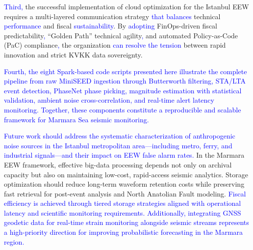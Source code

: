 \documentclass[data,article,submit,pdftex,moreauthors]{Definitions/mdpi}
\begin{document}
\textcolor{blue}{Third,} the successful implementation of cloud optimization for the Istanbul EEW requires a multi-layered communication strategy \textcolor{blue}{that balances} technical \textcolor{blue}{performance} and fiscal \textcolor{blue}{sustainability}. By \textcolor{blue}{adopting} FinOps-driven fiscal predictability\textcolor{blue}{,} ``Golden Path'' technical agility\textcolor{blue}{,} and automated Policy-as-Code (PaC) compliance\textcolor{blue}{,} the organization \textcolor{blue}{can resolve the tension} between rapid innovation and strict KVKK data sovereignty.

\textcolor{blue}{Fourth, the eight Spark-based code scripts presented here illustrate the complete pipeline from raw MiniSEED ingestion through Butterworth filtering, STA/LTA event detection, PhaseNet phase picking, magnitude estimation with statistical validation, ambient noise cross-correlation, and real-time alert latency monitoring. Together, these components constitute a reproducible and scalable framework for Marmara Sea seismic monitoring.}

\textcolor{blue}{Future work should address the systematic characterization of anthropogenic noise sources in the Istanbul metropolitan area—including metro, ferry, and industrial signals—and their impact on EEW false alarm rates.} In the Marmara EEW framework, effective big-data processing depends not only on archival capacity but also on maintaining low-cost, rapid-access seismic analytics. Storage optimization should reduce long-term waveform retention costs while preserving fast retrieval for post-event analysis and North Anatolian Fault modeling. \textcolor{blue}{Fiscal efficiency is achieved through tiered storage strategies aligned with operational latency and scientific monitoring requirements. Additionally, integrating GNSS geodetic data for real-time strain monitoring alongside seismic streams represents a high-priority direction for improving probabilistic forecasting in the Marmara region.}



\end{document}
